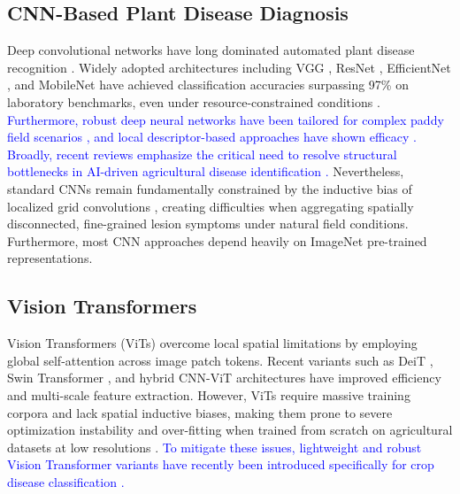 \documentclass[]{interact}
\theoremstyle{plain}
\theoremstyle{definition}
\theoremstyle{remark}
\begin{document}
\subsection{CNN-Based Plant Disease Diagnosis}
Deep convolutional networks have long dominated automated plant disease recognition \citep{mohanty2016using}. Widely adopted architectures including VGG \citep{ferentinos2018deep}, ResNet \citep{he2016deep, sethy2020deep, singh2024comprehensive}, EfficientNet \citep{tan2019efficientnet}, and MobileNet \citep{chen2021identification, too2019comparative} have achieved classification accuracies surpassing 97\% on laboratory benchmarks, even under resource-constrained conditions \citep{batool2025compact}. \textcolor{blue}{Furthermore, robust deep neural networks have been tailored for complex paddy field scenarios \citep{mookkandi2025robustdnn}, and local descriptor-based approaches have shown efficacy \citep{mookkandi2026robust}. Broadly, recent reviews emphasize the critical need to resolve structural bottlenecks in AI-driven agricultural disease identification \citep{nath2026bottleneck}.} Nevertheless, standard CNNs remain fundamentally constrained by the inductive bias of localized grid convolutions \citep{lecun1998gradient}, creating difficulties when aggregating spatially disconnected, fine-grained lesion symptoms under natural field conditions. Furthermore, most CNN approaches depend heavily on ImageNet pre-trained representations.

\subsection{Vision Transformers}
Vision Transformers (ViTs) \citep{dosovitskiy2020image} overcome local spatial limitations by employing global self-attention across image patch tokens. Recent variants such as DeiT \citep{touvron2021training}, Swin Transformer \citep{liu2021swin}, and hybrid CNN-ViT architectures \citep{yu2025stcfi} have improved efficiency and multi-scale feature extraction. However, ViTs require massive training corpora and lack spatial inductive biases, making them prone to severe optimization instability and over-fitting when trained from scratch on agricultural datasets at low resolutions \citep{borhani2022deep}. \textcolor{blue}{To mitigate these issues, lightweight and robust Vision Transformer variants have recently been introduced specifically for crop disease classification \citep{mookkandi2025robustvit}.}
\end{document}
